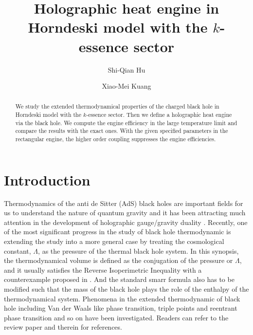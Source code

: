 \documentclass[preprint,showpacs,showkeys,onecolumn,nofootinbib]{revtex4}
\begin{document}

\title{Holographic heat engine in  Horndeski model with the $k$-essence sector}
\author{Shi-Qian Hu}
\author{Xiao-Mei Kuang}


\begin{abstract}
We study the extended thermodynamical properties of the charged black hole in Horndeski model with the $k$-essence sector.
Then we define a holographic  heat engine via the black hole.  We compute the engine efficiency in the large  temperature limit and
compare the results with the exact ones. With the given
specified parameters in the rectangular engine, the higher order  coupling suppresses the engine efficiencies.
\end{abstract}

\maketitle


\section{Introduction}
 Thermodynamics of the anti de Sitter (AdS) black holes are important fields for us to understand the nature of quantum gravity and it has been attracting much attention in the development of holographic gauge/gravity duality \cite{Maldacena:1997re,Gubser:1998bc,Witten:1998qj}. Recently, one of the most significant progress in the study of black hole thermodynamic is  extending the  study into a more general case by treating the cosmological constant, $\Lambda$, as the pressure of the thermal black hole system\cite{Kastor:2009wy,Dolan:2010ha,Cvetic:2010jb,Dolan:2011xt}. In this synopsis,  the thermodynamical volume is defined as the conjugation of the pressure or $\Lambda$, and it usually satisfies the Reverse Isoperimetric Inequality\cite{Cvetic:2010jb,Altamirano:2014tva} with a counterexample  proposed in
 \cite{Hennigar:2014cfa}. And the standard smarr formula also has to be modified such that  the mass of the black hole plays the role of the enthalpy of the thermodynamical system\cite{Kastor:2009wy}.
Phenomena in the extended thermodynamic of black hole including  Van der Waals like phase transition, triple points and reentrant phase transition and so on have been investigated. Readers can refer to the review paper \cite{Kubiznak:2016qmn} and therein for references.
\end{document}
